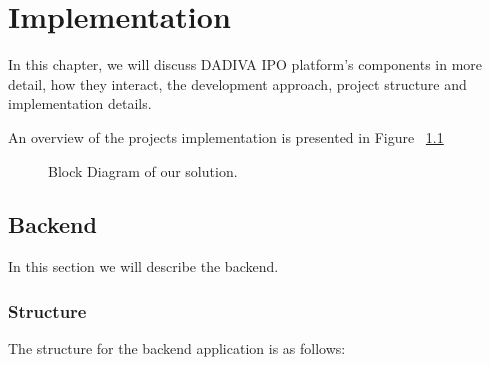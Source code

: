 \chapter{Implementation} \label{cap:implementation}

In this chapter, we will discuss DADIVA IPO platform's components in more detail, how they interact, the development approach, project structure and implementation details.

An overview of the projects implementation is presented in Figure ~\ref{fig:Block_Diagram}

\begin{figure}[H]
	\begin{center}
	\end{center}
	\caption{Block Diagram of our solution.}\label{fig:Block_Diagram}
\end{figure}

\newpage
\section{Backend} \label{backend}
In this section we will describe the backend.

\subsection{Structure}

The structure for the backend application is as follows:

